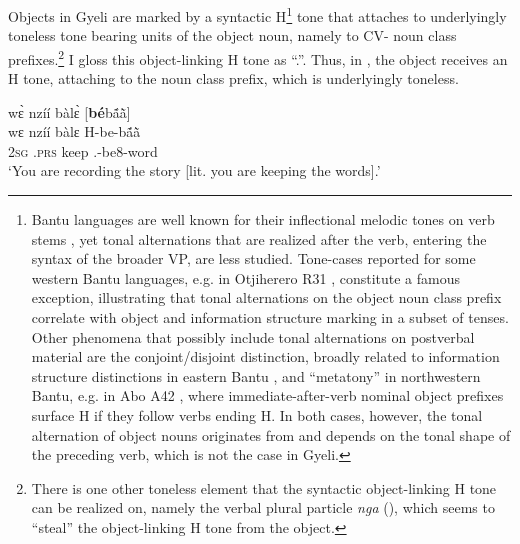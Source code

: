 


Objects in Gyeli are marked by a syntactic H\footnote{Bantu languages are well known for their inflectional melodic tones on verb stems \citep{odden2014}, yet tonal alternations that are realized after the verb, entering the syntax of the broader VP, are less studied. Tone-cases reported for some western Bantu languages, e.g. in Otjiherero R31 \citep{Wal2015}, constitute a famous exception, illustrating that tonal alternations on the object noun class prefix correlate with object and information structure marking in a subset of tenses. Other phenomena that possibly include tonal alternations on postverbal material are the conjoint/disjoint distinction, broadly related to information structure distinctions in eastern Bantu \citep{Wal2017}, and ``metatony'' in northwestern Bantu, e.g. in Abo A42 \citep{hyman2012}, where immediate-after-verb nominal object prefixes surface H if they follow verbs ending H. In both cases, however, the  tonal alternation of object nouns originates from and depends on the tonal shape of the preceding verb, which is not the case in Gyeli.} tone that attaches to underlyingly toneless tone bearing units of the object noun, namely to CV- noun class prefixes.\footnote{There is one other toneless element that the syntactic object-linking H tone can be realized on, namely the verbal plural particle {\itshape nga} (), which seems to ``steal'' the object-linking H tone from the object.} I gloss this object-linking H tone as ``{\OBJ}.{\LINK}''.   Thus, in , the object receives an H tone, attaching to the noun class prefix, which is underlyingly toneless.

\ea \label{LINK1}
  \glll   wɛ̀ nzíí bàlɛ̀ [{\bfseries bé}bã́ã̀]\textsubscript{{\OBJ}} \\
      wɛ nzíí bàlɛ {\db}H-be-bã́ã̀ \\
            2\textsc{sg} {\PROG}.\textsc{prs} keep {\db}{\OBJ}.{\LINK}-be8-word\\
    \trans `You are recording the story [lit. you are keeping the words].'
\z



